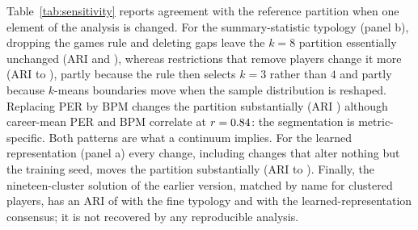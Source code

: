 Table~\ref{tab:sensitivity} reports agreement with the reference partition when one element of the analysis is changed. For the summary-statistic typology (panel b), dropping the games rule and deleting gaps leave the $k=8$ partition essentially unchanged (ARI \ariSEightSummaryNogames{} and \ariSEightSummaryConsecutive), whereas restrictions that remove players change it more (ARI \ariSEightMinRestrict{} to \ariSEightMaxRestrict), partly because the rule then selects $k=3$ rather than $4$ and partly because $k$-means boundaries move when the sample distribution is reshaped. Replacing PER by BPM changes the partition substantially (ARI \ariSEightBpm) although career-mean PER and BPM correlate at $r=0.84$: the segmentation is metric-specific. Both patterns are what a continuum implies. For the learned representation (panel a) every change, including changes that alter nothing but the training seed, moves the partition substantially (ARI \ariAMin{} to \ariAMax). Finally, the nineteen-cluster solution of the earlier version, matched by name for \nMatchedOld{} clustered players, has an ARI of \ariOldEight{} with the fine typology and \ariOldAe{} with the learned-representation consensus; it is not recovered by any reproducible analysis.

\begin{table}[t]\centering\small
\caption{Sensitivity of the partitions: ARI with the reference partition on players common to both analyses, at the selected $k$ of each variant and at $k=8$.}
\label{tab:sensitivity}
\resizebox{\textwidth}{!}{}
\end{table}
